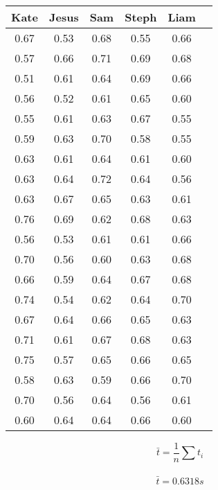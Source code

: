 \documentclass[11pt, letterpaper, includehead]{article}
\begin{document}
  \begin{center} 
    \begin{tabular}{|  c | c | c | c | c | c | } 
      \hline
        \textbf{Kate} & \textbf{Jesus} &\textbf{Sam} & \textbf{Steph} & \textbf{Liam}\\ 
        \hline\hline
        0.67 & 0.53 & 0.68 & 0.55 & 0.66 \\ 
        \hline
        0.57 & 0.66 & 0.71 & 0.69 & 0.68 \\ 
        \hline
        0.51 & 0.61 & 0.64 & 0.69 & 0.66 \\ 
        \hline
        0.56 & 0.52 & 0.61 & 0.65 & 0.60 \\ 
        \hline
        0.55 & 0.61 & 0.63 & 0.67 & 0.55 \\ 
        \hline
        0.59 & 0.63 & 0.70 & 0.58 & 0.55 \\ 
        \hline
        0.63 & 0.61 & 0.64 & 0.61 & 0.60 \\ 
        \hline
        0.63 & 0.64 & 0.72 & 0.64 & 0.56 \\ 
        \hline
        0.63 & 0.67 & 0.65 & 0.63 & 0.61 \\ 
        \hline
        0.76 & 0.69 & 0.62 & 0.68 & 0.63 \\ 
        \hline
        0.56 & 0.53 & 0.61 & 0.61 & 0.66 \\ 
        \hline
        0.70 & 0.56 & 0.60 & 0.63 & 0.68 \\ 
        \hline
        0.66 & 0.59 & 0.64 & 0.67 & 0.68 \\ 
        \hline
        0.74 & 0.54 & 0.62 & 0.64 & 0.70 \\ 
        \hline
        0.67 & 0.64 & 0.66 & 0.65 & 0.63 \\ 
        \hline
        0.71 & 0.61 & 0.67 & 0.68 & 0.63 \\ 
        \hline
        0.75 & 0.57 & 0.65 & 0.66 & 0.65 \\ 
        \hline
        0.58 & 0.63 & 0.59 & 0.66 & 0.70 \\ 
        \hline
        0.70 & 0.56 & 0.64 & 0.56 & 0.61 \\ 
        \hline
        0.60 & 0.64 & 0.64 & 0.66 & 0.60 \\ 
        \hline
      \end{tabular} 
  \end{center}


  $$\bar{t} = \frac{1}{n}\sum t_i$$\\
  $$\bar{t} = 0.6318s$$
\end{document}
